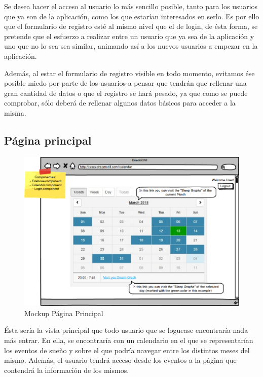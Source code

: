 \documentclass[11pt,openany]{book}
\begin{document}
Se desea hacer el acceso al usuario lo más sencillo posible, tanto para los usuarios que ya son de la aplicación, como los que estarían interesados en serlo. Es por ello que el formulario de registro esté al mismo nivel que el de login, de ésta forma, se pretende que el esfuerzo a realizar entre un usuario que ya sea de la aplicación y uno que no lo sea sea similar, animando así a los nuevos usuarios a empezar en la aplicación. 

Además, al estar el formulario de registro visible en todo momento, evitamos ése posible miedo por parte de los usuarios a pensar que tendrán que rellenar una gran cantidad de datos o que el registro se hará pesado, ya que como se puede comprobar, sólo deberá de rellenar algunos datos básicos para acceder a la misma.

\subsection{Página principal}

\begin{figure}[H]
\centering
\includegraphics[totalheight=6.5cm]{mockups/CalendarPage.png}
\caption{Mockup Página Principal}
\end{figure}
\par\bigskip 
\noindent

Ésta sería la vista principal que todo usuario que se loguease encontraría nada más entrar. En ella, se encontraría con un calendario en el que se representarían los eventos de sueño y sobre el que podría navegar entre los distintos meses del mismo. Además, el usuario tendrá acceso desde los eventos a la página que contendrá la información de los mismos.
\end{document}
